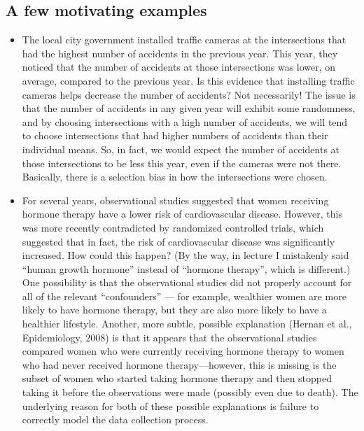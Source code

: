 \documentclass[12pt]{article}
\begin{document}
\subsection{A few motivating examples}
\begin{itemize}
\item The local city government installed traffic cameras at the intersections that had the highest number of accidents in the previous year. This year, they noticed that the number of accidents at those intersections was lower, on average, compared to the previous year. Is this evidence that installing traffic cameras helps decrease the number of accidents? Not necessarily! The issue is that the number of accidents in any given year will exhibit some randomness, and by choosing intersections with a high number of accidents, we will tend to choose intersections that had higher numbers of accidents than their individual means. So, in fact, we would expect the number of accidents at those intersections to be less this year, even if the cameras were not there. Basically, there is a selection bias in how the intersections were chosen.

\item For several years, observational studies suggested that women receiving hormone therapy have a lower risk of cardiovascular disease. However, this was more recently contradicted by randomized controlled trials, which suggested that in fact, the risk of cardiovascular disease was significantly increased. How could this happen?  (By the way, in lecture I mistakenly said ``human growth hormone'' instead of ``hormone therapy'', which is different.) One possibility is that the observational studies did not properly account for all of the relevant ``confounders'' --- for example, wealthier women are more likely to have hormone therapy, but they are also more likely to have a healthier lifestyle. Another, more subtle, possible explanation (Hernan et al., Epidemiology, 2008) is that it appears that the observational studies compared women who were currently receiving hormone therapy to women who had never received hormone therapy---however, this is missing is the subset of women who started taking hormone therapy and then stopped taking it before the observations were made (possibly even due to death). The underlying reason for both of these possible explanations is failure to correctly model the data collection process.


\end{itemize}
\end{document}

